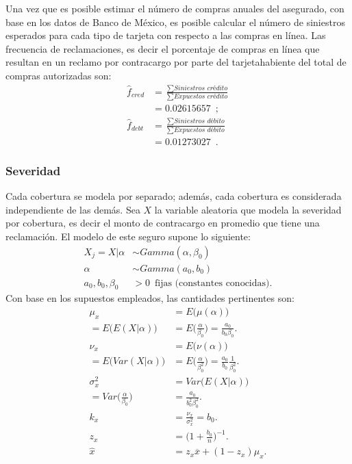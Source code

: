 \documentclass{article}
\begin{document}
\newpage
Una vez que es posible estimar el número de compras anuales del asegurado, con base en los datos de Banco de México, es posible calcular el número de siniestros esperados para cada tipo de tarjeta con respecto a las compras en línea. Las frecuencia de reclamaciones, es decir el porcentaje de compras en línea que resultan en un reclamo por contracargo por parte del tarjetahabiente del total de compras autorizadas son: 
\begin{align*}
    \hat{f}_{cred} &= \frac{\sum \textit{Siniestros crédito}}{ 
    \sum \textit{Expuestos crédito}} \\ 
    &= 0.02615657 \enspace ; \\
    \hat{f}_{debt} &= \frac{\sum \textit{Siniestros débito}}{ 
    \sum \textit{Expuestos débito}} \\ 
    &= 0.01273027 \enspace .
\end{align*}
\subsubsection*{Severidad}
Cada cobertura se modela por separado; además, cada cobertura es considerada independiente de las demás. Sea $X$ la variable aleatoria que modela la severidad por cobertura, es decir el monto de contracargo en promedio que tiene una reclamación. El modelo de este seguro supone lo siguiente: 
\begin{align*}
    X_j = X | \alpha &\sim Gamma(\alpha, \beta_0) \\
    \alpha &\sim Gamma(a_0, b_0) \\
    a_0, b_0, \beta_0 &> 0 \enspace \text{
     fijas (constantes conocidas)}.
\end{align*}
Con base en los supuestos empleados, las cantidades pertinentes son: 
\begin{align*}
    \mu_x &= E \big ( \mu(\alpha) \big ) \\
    = E \big ( E ( X | \alpha ) \big ) 
    &= E \bigg ( \frac{\alpha}{ \beta_0 } \bigg)
    = \frac{a_0}{ b _0 \beta_0 } . \\
    \nu_ x &= E \big ( \nu(\alpha) \big ) \\
    = E \big ( Var(  X | \alpha) \big ) 
    &= E \bigg ( \frac{\alpha}{ \beta_0^2 } \bigg ) 
    = \frac{a_0}{ b _0 } \frac{1}{\beta_0^2 } . \\
    \sigma^2_x &= Var \big ( E ( X | \alpha) \big ) \\
    = Var \bigg( \frac{\alpha}{ \beta_0 } \bigg ) 
    &= \frac{a_0}{ b_0^2 \beta_0^2 } . \\
    k_x &= \frac{\nu_x}{\sigma^2_x} = b_0 . \\
    z_x &= \bigg ( 1 + \frac{b_0}{n} \bigg )^{-1}.  \\
    \hat{x} &= z_x \overline{x} + (1 - z_x) \mu_x . 
\end{align*}
\end{document}
